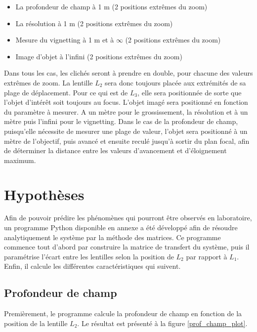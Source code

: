 \documentclass[11pt,letterpaper]{article}
\begin{document}
\begin{itemize}
    \item La profondeur de champ à 1 m (2 positions extrêmes du zoom)
    \item La résolution à 1 m (2 positions extrêmes du zoom)
    \item Mesure du vignetting à 1 m et à $\infty$ (2 positions extrêmes du zoom)
    \item Image d’objet à l’infini (2 positions extrêmes du zoom)
\end{itemize}

Dans tous les cas, les clichés seront à prendre en double, pour chacune des valeurs extrêmes de zoom. La lentille $L_2$ sera donc toujours placée aux extrémités de sa plage de déplacement. Pour ce qui est de $L_3$, elle sera positionnée de sorte que l'objet d'intérêt soit toujours au focus. L'objet imagé sera positionné en fonction du paramètre à mesurer. A un mètre pour le grossissement, la résolution et à un mètre puis l'infini pour le vignetting. Dans le cas de la profondeur de champ, puisqu'elle nécessite de mesurer une plage de valeur, l'objet sera positionné à un mètre de l'objectif, puis avancé et ensuite reculé jusqu'à sortir du plan focal, afin de déterminer la distance entre les valeurs d'avancement et d'éloignement maximum.

\section{Hypothèses}


Afin de pouvoir prédire les phénomènes qui pourront être observés en laboratoire, un
programme Python disponible en annexe a été développé afin de résoudre analytiquement
le système par la méthode des matrices. Ce programme commence tout d'abord par construire
la matrice de transfert du système, puis il paramétrise l'écart entre les lentilles selon
la position de $L_2$ par rapport à $L_1$. Enfin, il calcule les différentes caractéristiques
qui suivent.

\subsection{Profondeur de champ}

Premièrement, le programme calcule la profondeur de champ en fonction de la position de
la lentille $L_2$. Le résultat est présenté à la figure \ref{prof_champ_plot}.
\end{document}
